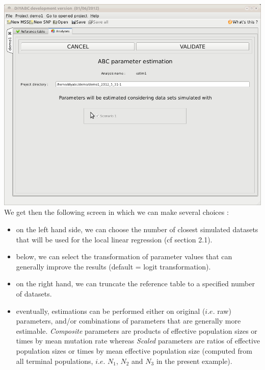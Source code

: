 \includegraphics[scale=0.35]{gui_pictures/Capture-DIYABC-35.png} \\
 
We get then the following screen in which we can make several choices :
\begin{itemize}
 \item on the left hand side, we can choose the number of closest simulated datasets that will be used for the local linear regression (cf section 2.1).
 \item below, we can select the transformation of parameter values that can generally improve the results (default = logit transformation).
 \item on the right hand, we can truncate the reference table to a specified number of datasets.
 \item eventually, estimations can be performed either on original ($i.e.$ raw) parameters, and/or combinations of parameters that are generally more estimable. \emph{Composite} parameters are products of effective population sizes or times by mean mutation rate whereas \emph{Scaled} parameters are ratios of effective population sizes or times by mean effective population size (computed from all terminal populations, $i.e.$ $N_1$, $N_2$ and $N_3$ in the present example). 
\end{itemize}

